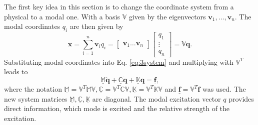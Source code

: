 \documentclass[conference]{journal}
\newcommand{\bb}[1]{\mathbb{#1}}
\newcommand{\B}[1]{\mathbf{#1}}
\newcommand{\Bx}{\B{x}}
\newcommand{\Bv}{\B{v}}
\newcommand{\Bq}{\B{q}}
\newcommand{\M}{\bb{M}}
\newcommand{\C}{\bb{C}}
\newcommand{\K}{\bb{K}}
\begin{document}
	The first key idea in this section is to change the coordinate system from a physical to a modal one. With a basis $\bb{V}$ given by the eigenvectors $\Bv_1, \ldots, \Bv_n$. The modal coordinates $q_i$ are then given by
	\begin{equation} \label{eq:3modalB}
	\Bx = \sum\limits_{i=1}^{n} \Bv_i q_i =
	\begin{bmatrix} \Bv_1 \ldots \Bv_n \end{bmatrix}
	\begin{bmatrix} q_1 \\ \vdots \\ q_n \end{bmatrix} 
	= \bb{V} \Bq.
	\end{equation}
	Substituting modal coordinates into Eq. \eqref{eq:3system} and multiplying with $ \bb{V}^T $ leads to
	\begin{equation} \label{eq:3modalS}
	\underline{\M} \ddot{\Bq} + \underline{\C} \dot{\Bq} + \underline{\K} \Bq = \underline{\B{f}},
	\end{equation}
	where the notation $\underline{\M} = \bb{V}^T \M \bb{V}, \underline{\C} = \bb{V}^T \C \bb{V}, \underline{\K} = \bb{V}^T \K \bb{V}$ and $ \underline{\B{f}} = \bb{V}^T \B{f}$ was used. The new system matrices $\underline{\M}, \underline{\C}, \underline{\K}$ are diagonal. The modal excitation vector $ q $ provides direct information, which mode is excited and the relative strength of the excitation. 
	
\end{document}
